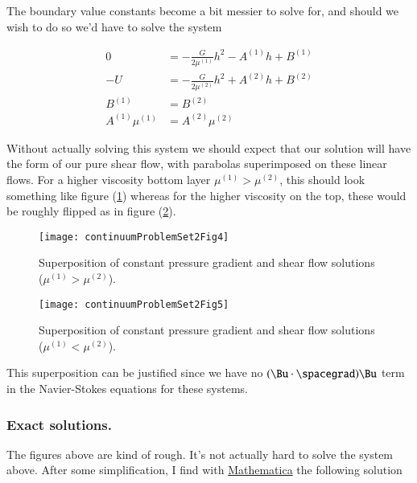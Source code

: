 The boundary value constants become a bit messier to solve for, and should we wish to do so we'd have to solve the system

\begin{align}\label{eqn:continuumProblemSet2:800}
0 &= -\frac{G}{2 \mu^{(1)}} h^2 - A^{(1)} h + B^{(1)} \\
-U &= -\frac{G}{2 \mu^{(2)}} h^2 + A^{(2)} h + B^{(2)} \\
B^{(1)} &= B^{(2)} \\
A^{(1)} \mu^{(1)} &= A^{(2)} \mu^{(2)} 
\end{align}

Without actually solving this system we should expect that our solution will have the form of our pure shear flow, with parabolas superimposed on these linear flows.  For a higher viscosity bottom layer $\mu^{(1)} > \mu^{(2)}$, this should look something like figure (\ref{fig:continuumProblemSet2:continuumProblemSet2Fig4}) whereas for the higher viscosity on the top, these would be roughly flipped as in figure (\ref{fig:continuumProblemSet2:continuumProblemSet2Fig5}).

\begin{figure}[htp]
   \centering
   \texttt{[image: continuumProblemSet2Fig4]}
   \caption{Superposition of constant pressure gradient and shear flow solutions ($\mu^{(1)} > \mu^{(2)}$).}\label{fig:continuumProblemSet2:continuumProblemSet2Fig4}
\end{figure}

\begin{figure}[htp]
   \centering
   \texttt{[image: continuumProblemSet2Fig5]}
   \caption{Superposition of constant pressure gradient and shear flow solutions ($\mu^{(1)} < \mu^{(2)}$).}\label{fig:continuumProblemSet2:continuumProblemSet2Fig5}
\end{figure}

This superposition can be justified since we have no $(\Bu \cdot \spacegrad)\Bu$ term in the Navier-Stokes equations for these systems.

\subsubsection{Exact solutions.}

The figures above are kind of rough.  It's not actually hard to solve the system above.  After some simplification, I find with \href{http://github.com/peeterjoot/physicsplay/blob/master/notes/phy454/problemSetIIQ3exactSolution.cdf}{Mathematica} the following solution

